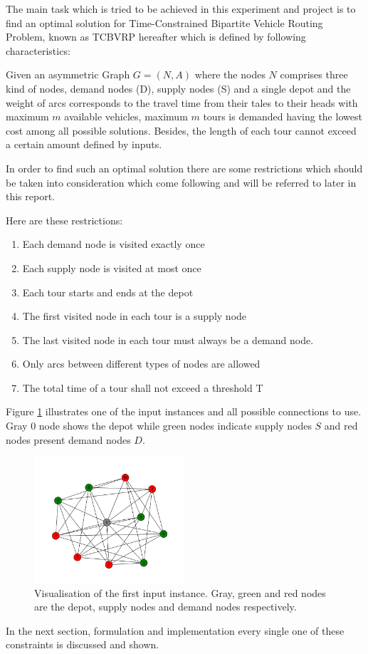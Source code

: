 The main task which is tried to be achieved in this experiment and project
is to find an optimal solution for Time-Constrained Bipartite Vehicle Routing
Problem, known as TCBVRP hereafter which is defined by following
characteristics:

Given an asymmetric Graph $G=(N,A)$ where the nodes $N$ comprises three kind of
nodes, demand nodes (D), supply nodes (S) and a single depot and the weight of
arcs corresponds to the travel time from their tales to their heads with maximum
$m$ available vehicles, maximum $m$ tours is demanded having the lowest cost
among all possible solutions. Besides, the length of each tour cannot exceed a
certain amount defined by inputs.

In order to find such an optimal solution there are some restrictions which
should be taken into consideration which come following and will be referred to
later in this report.

Here are these restrictions:

\begin{enumerate}
  \item Each demand node is visited exactly once
  \item Each supply node is visited at most once
  \item Each tour starts and ends at the depot
  \item The first visited node in each tour is a supply node
  \item The last visited node in each tour must always be a demand
node.
\item Only arcs between different types of nodes are allowed
\item The total time of a tour shall not exceed a threshold T
\end{enumerate}

Figure \ref{fig:vis} illustrates one of the input instances and all
possible connections to use. Gray $0$ node shows the depot while green nodes indicate supply
nodes $S$ and red nodes present demand nodes $D$.

\begin{figure}[H]
  \centering
    \includegraphics[width=0.5\textwidth]{./figures/instance1.png}
    
  \caption{\label{fig:vis} Visualisation of the first input instance. Gray,
  green and red nodes are the depot, supply nodes and demand nodes
  respectively.}
  
\end{figure}

In the next section, formulation and implementation every single one of these
constraints is discussed and shown.
